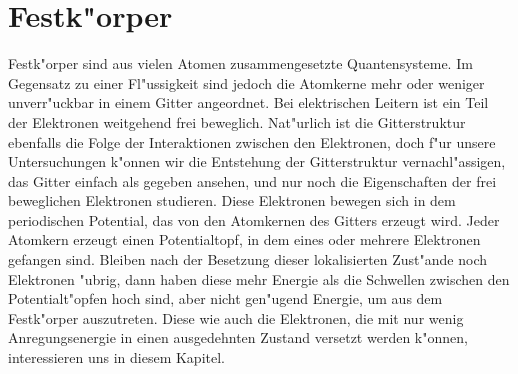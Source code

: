 \chapter{Festk"orper\label{chapter:festkoerper}}
\rhead{}
Festk"orper sind aus vielen Atomen zusammengesetzte Quantensysteme.
Im Gegensatz zu einer Fl"ussigkeit sind jedoch die Atomkerne mehr
oder weniger unverr"uckbar in einem Gitter angeordnet.
Bei elektrischen Leitern ist ein Teil der Elektronen weitgehend frei
beweglich.
Nat"urlich ist die Gitterstruktur ebenfalls die Folge der Interaktionen
zwischen den Elektronen, doch f"ur unsere Untersuchungen k"onnen wir
die Entstehung der Gitterstruktur vernachl"assigen, das Gitter einfach als
gegeben ansehen, und nur noch die Eigenschaften der frei beweglichen
Elektronen studieren.
Diese Elektronen bewegen sich in dem periodischen Potential, das von
den Atomkernen des Gitters erzeugt wird.
Jeder Atomkern erzeugt einen Potentialtopf, in dem eines oder mehrere
Elektronen gefangen sind.
Bleiben nach der Besetzung dieser lokalisierten Zust"ande noch
Elektronen "ubrig, dann haben diese mehr Energie als die Schwellen zwischen
den Potentialt"opfen hoch sind, aber nicht gen"ugend Energie, um
aus dem Festk"orper auszutreten.
Diese wie auch die Elektronen, die mit nur wenig Anregungsenergie
in einen ausgedehnten Zustand versetzt werden k"onnen, interessieren
uns in diesem Kapitel.

